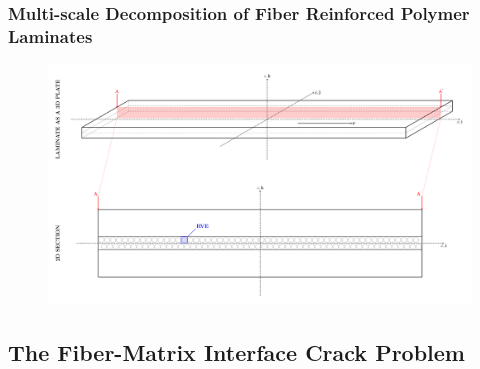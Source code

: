 \documentclass[first,firstsupp,lastsupp,last,hyperref,table]{ETHclass}
\begin{document}
\begin{frame}
\frametitle{\small Multi-scale Decomposition of Fiber Reinforced Polymer Laminates}
\vspace{-1cm}
\centering
\begin{figure}
\centering
\includegraphics[height=0.8\textheight]{laminate-section.pdf}
\label{fig:spread-tow-schematic}
\end{figure}
\end{frame}

\subsection{The Fiber-Matrix Interface Crack Problem}
\end{document}
